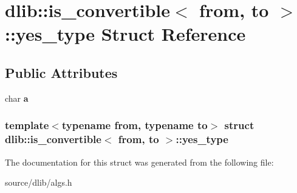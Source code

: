 \hypertarget{structdlib_1_1is__convertible_1_1yes__type}{
\section{dlib::is\_\-convertible$<$ from, to $>$::yes\_\-type Struct Reference}
\label{structdlib_1_1is__convertible_1_1yes__type}
}
\subsection*{Public Attributes}
\begin{DoxyCompactItemize}
\item 
\hypertarget{structdlib_1_1is__convertible_1_1yes__type_ab16a8cf639bd536ca54e3a750ca028e7}{
char {\bfseries a}}
\label{structdlib_1_1is__convertible_1_1yes__type_ab16a8cf639bd536ca54e3a750ca028e7}

\end{DoxyCompactItemize}
\subsubsection*{template$<$typename from, typename to$>$ struct dlib::is\_\-convertible$<$ from, to $>$::yes\_\-type}



The documentation for this struct was generated from the following file:\begin{DoxyCompactItemize}
\item 
source/dlib/algs.h\end{DoxyCompactItemize}
